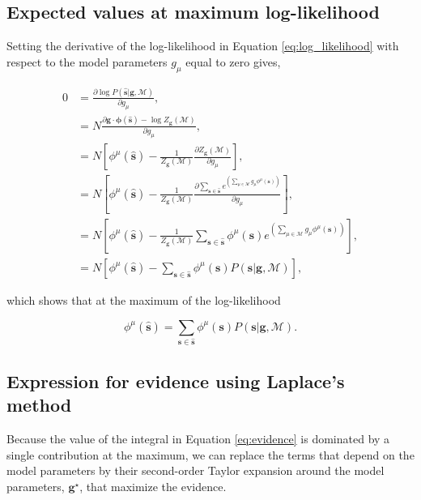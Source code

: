 \subsection{Expected values at maximum log-likelihood} \label{sec:max_log_likelihood}

Setting the derivative of the log-likelihood in Equation \ref{eq:log_likelihood} with respect to the model parameters $g_\mu$ equal to zero gives,

\begin{align*}
    0 &= \frac{\partial \log P(\mathbf{\hat{s}} | \mathbf{g}, \mathcal{M})}{\partial g_\mu}, \\
    &= N \frac{\partial  \mathbf{g} \cdot \mathbf{\phi}(\mathbf{\hat{s}}) - \log {Z_\mathbf{g}(\mathcal{M})}}{\partial g_\mu}, \\
    &= N \left[ \phi^\mu(\mathbf{\hat{s}}) - \frac{1}{Z_\mathbf{g}(\mathcal{M})} \frac{\partial {Z_\mathbf{g}(\mathcal{M})}}{\partial g_\mu} \right], \\
    &= N \left[ \phi^\mu(\mathbf{\hat{s}}) - \frac{1}{Z_\mathbf{g}(\mathcal{M})} \frac{\partial \sum_{\mathbf{s} \in \mathbf{\hat{s}}} e^{\left(\sum_{\mu \in \mathcal{M}} g_\mu \phi^\mu(\mathbf{s}) \right)}}{\partial g_\mu} \right], \\
    &= N \left[ \phi^\mu(\mathbf{\hat{s}}) - \frac{1}{Z_\mathbf{g}(\mathcal{M})} \sum_{\mathbf{s} \in \mathbf{\hat{s}}} \phi^\mu(\mathbf{s}) e^{\left(\sum_{\mu \in \mathcal{M}} g_\mu \phi^\mu(\mathbf{s}) \right)} \right], \\
    &= N \left[ \phi^\mu(\mathbf{\hat{s}}) - \sum_{\mathbf{s} \in \mathbf{\hat{s}}} \phi^\mu(\mathbf{s}) P(\mathbf{s} | \mathbf{g}, \mathcal{M})\right],
\end{align*}

\noindent
which shows that at the maximum of the log-likelihood

\begin{equation}
  \phi^\mu(\mathbf{\hat{s}}) = \sum_{\mathbf{s} \in \mathbf{\hat{s}}} \phi^\mu(\mathbf{s}) P(\mathbf{s} | \mathbf{g}, \mathcal{M}).
\end{equation}

\subsection{Expression for evidence using Laplace's method} \label{sec:laplace}

Because the value of the integral in Equation \ref{eq:evidence} is dominated by a single contribution at the maximum, we can replace the terms that depend on the model parameters by their second-order Taylor expansion around the model parameters, $\mathbf{g}^\star$, that maximize the evidence.

